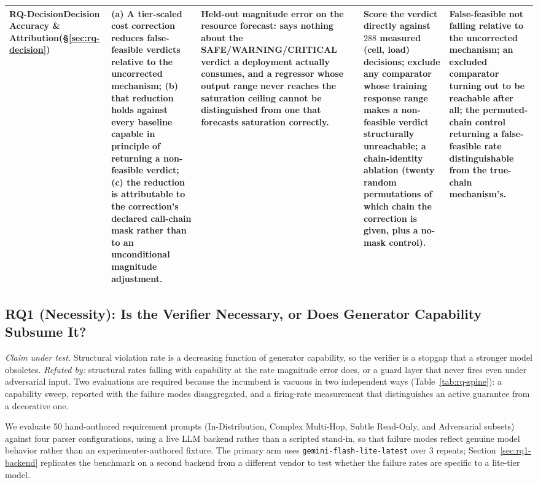 \documentclass[journal, 10pt]{IEEEtran}
\begin{document}
\begin{table}[!t]
\begin{tabular}{p{1.5cm}p{3.2cm}p{4.2cm}p{3.9cm}p{3.5cm}}
\addlinespace
\textbf{RQ-Decision}\newline Decision Accuracy \& Attribution\newline (\S\ref{sec:rq-decision})
& (a) A tier-scaled cost correction reduces false-feasible verdicts relative to the uncorrected mechanism; (b) that reduction holds against every baseline capable in principle of returning a non-feasible verdict; (c) the reduction is attributable to the correction's declared call-chain mask rather than to an unconditional magnitude adjustment.
& Held-out magnitude error on the resource forecast: says nothing about the SAFE/WARNING/CRITICAL verdict a deployment actually consumes, and a regressor whose output range never reaches the saturation ceiling cannot be distinguished from one that forecasts saturation correctly.
& Score the verdict directly against $288$ measured (cell, load) decisions; exclude any comparator whose training response range makes a non-feasible verdict structurally unreachable; a chain-identity ablation (twenty random permutations of which chain the correction is given, plus a no-mask control).
& False-feasible not falling relative to the uncorrected mechanism; an excluded comparator turning out to be reachable after all; the permuted-chain control returning a false-feasible rate distinguishable from the true-chain mechanism's. \\
\bottomrule
\end{tabular}
\end{table}

\subsection{RQ1 (Necessity): Is the Verifier Necessary, or Does Generator Capability Subsume It?}
\label{sec:rq1}

\emph{Claim under test.} Structural violation rate is a decreasing function of
generator capability, so the verifier is a stopgap that a stronger model
obsoletes. \emph{Refuted by:} structural rates falling with capability at the
rate magnitude error does, or a guard layer that never fires even under
adversarial input. Two evaluations are required because the incumbent is vacuous
in two independent ways (Table~\ref{tab:rq-spine}): a capability sweep, reported
with the failure modes disaggregated, and a firing-rate measurement that
distinguishes an active guarantee from a decorative one.

We evaluate 50 hand-authored requirement prompts (In-Distribution, Complex Multi-Hop, Subtle Read-Only, and Adversarial subsets) against four parser configurations, using a live LLM backend rather than a scripted stand-in, so that failure modes reflect genuine model behavior rather than an experimenter-authored fixture. The primary arm uses \texttt{gemini-flash-lite-latest} over $3$ repeats; Section~\ref{sec:rq1-backend} replicates the benchmark on a second backend from a different vendor to test whether the failure rates are specific to a lite-tier model.
\end{document}
